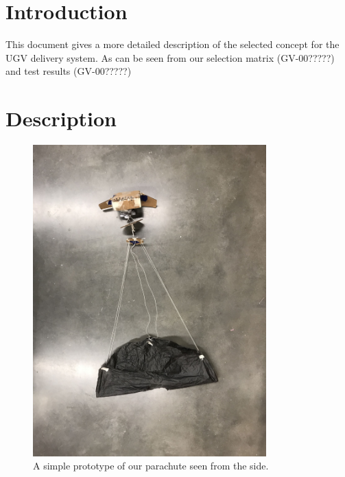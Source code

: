 \documentclass[]{auvsi_doc}
\begin{document}
\begin{AUVSITitlePage}
\begin{artifacttable}
\end{artifacttable}
\end{AUVSITitlePage}

\section{Introduction}
This document gives a more detailed description of the selected concept for the UGV delivery system. As can be seen from our selection matrix (GV-00?????) and test results (GV-00?????) 

\section{Description}


\begin{figure}[h]
\centering
\includegraphics[width=90mm]{./figs/Parachute_Side.jpg}
\caption{A simple prototype of our parachute seen from the side.\label{overflow}}
\end{figure}
\end{document}
